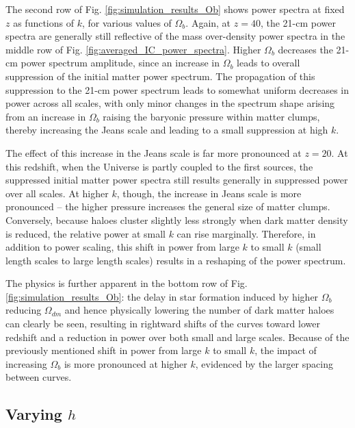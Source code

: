 \documentclass[floats,floatfix,showpacs,amssymb,prd,superscriptaddress,nofootinbib]{revtex4-2} %
\begin{document}

The second row of Fig. \ref{fig:simulation_results_Ob} shows power spectra at fixed $z$ as functions of $k$, for various values of $\Omega_b$. Again, at $z = 40$, the 21-cm power spectra are generally still reflective of the mass over-density power spectra in the middle row of Fig. \ref{fig:averaged_IC_power_spectra}. Higher $\Omega_b$ decreases the 21-cm power spectrum amplitude, since an increase in $\Omega_b$ leads to overall suppression of the initial matter power spectrum.  The propagation of this suppression to the 21-cm power spectrum leads to somewhat uniform decreases in power across all scales, with only minor changes in the spectrum shape arising from an increase in $\Omega_b$ raising the baryonic pressure within matter clumps, thereby increasing the Jeans scale and leading to a small suppression at high $k$. 

The effect of this increase in the Jeans scale is far more pronounced at $z = 20$. At this redshift, when the Universe is partly coupled to the first sources, the suppressed initial matter power spectra still results generally in suppressed power over all scales. At higher $k$, though, the increase in Jeans scale is more pronounced -- the higher pressure increases the general size of matter clumps. Conversely, because haloes cluster slightly less strongly when dark matter density is reduced, the relative power at small $k$ can rise marginally. Therefore, in addition to power scaling, this shift in power from large $k$ to small $k$ (small length scales to large length scales) results in a reshaping of the power spectrum.

The physics is further apparent in the bottom row of Fig. \ref{fig:simulation_results_Ob}: the delay in star formation induced by higher $\Omega_b$ reducing $\Omega_{dm}$ and hence physically lowering the number of dark matter haloes can clearly be seen, resulting in rightward shifts of the curves toward lower redshift and a reduction in power over both small and large scales. Because of the previously mentioned shift in power from large $k$ to small $k$, the impact of increasing $\Omega_b$ is more pronounced at higher $k$, evidenced by the larger spacing between curves.



\subsection{Varying $h$}
\end{document}
